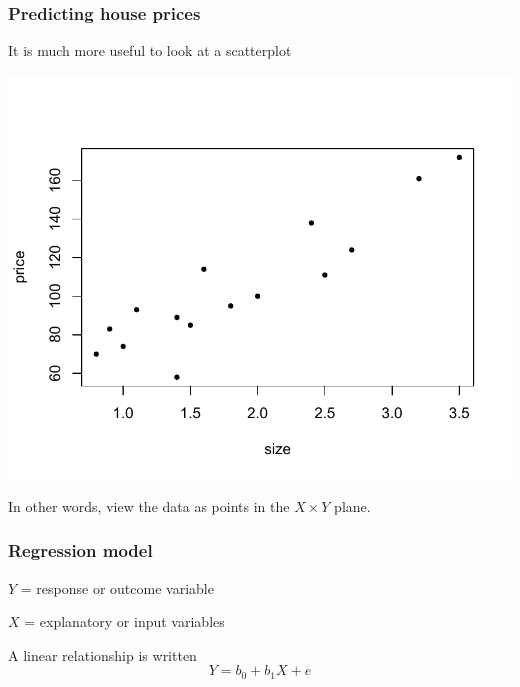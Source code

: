 \documentclass{beamer}
\newcommand{\bl}{\color{lightblue}}
\newcommand{\rd}{\color{burntorange}}
\newcommand{\bk}{\color{black}}
\newcommand{\skoo}{\vspace{.2in}}
\begin{document}

\begin{frame}
\frametitle{Predicting house prices}

\vspace{2mm}
It is much more useful to look at a scatterplot \vspace{-10mm}
\begin{center}\includegraphics[scale=0.65]{figures/houseplot}\end{center}

\vspace{-5mm}
In other words, view the data as points in the $X
\times Y$ plane.
\end{frame}



\begin{frame}
\frametitle{Regression model} \vspace{-0.5cm}

\bl $Y$ \bk= \rd response or outcome variable

\bl $X$ \bk= \rd explanatory or input variables \bk

\skoo 
A  \bl linear \bk relationship is written
\[
Y = b_0 + b_1 X + e
\]

\end{frame}

\end{document}
